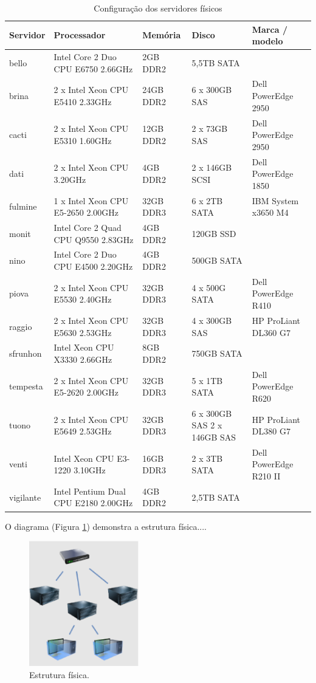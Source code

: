 \begin{table}
\caption {Configuração dos servidores físicos}
\label{tab:servfisicos}
\begin{center}
\begin{tabular}{|l|p{3.8cm}|l|p{3cm}|l|}\hline
Servidor & Processador & Memória & Disco & Marca / modelo\\\hline
bello & Intel Core 2 Duo CPU E6750 2.66GHz & 2GB DDR2 & 5,5TB SATA & \\\hline
brina & 2 x Intel Xeon CPU E5410 2.33GHz & 24GB DDR2 & 6 x 300GB SAS & Dell PowerEdge 2950\\\hline
cacti & 2 x Intel Xeon CPU E5310 1.60GHz & 12GB DDR2 & 2 x 73GB SAS & Dell PowerEdge 2950\\\hline
dati & 2 x Intel Xeon CPU 3.20GHz & 4GB DDR2 & 2 x 146GB SCSI & Dell PowerEdge 1850\\\hline
fulmine & 1 x Intel Xeon CPU E5-2650 2.00GHz & 32GB DDR3 & 6 x 2TB SATA & IBM System x3650 M4\\\hline
monit & Intel Core 2 Quad CPU Q9550 2.83GHz & 4GB DDR2 & 120GB SSD & \\\hline
nino & Intel Core 2 Duo CPU E4500 2.20GHz & 4GB DDR2 & 500GB SATA & \\\hline
piova & 2 x Intel Xeon CPU E5530 2.40GHz & 32GB DDR3 & 4 x 500G SATA & Dell PowerEdge R410\\\hline
raggio & 2 x  Intel Xeon CPU E5630 2.53GHz & 32GB DDR3 & 4 x 300GB SAS & HP ProLiant DL360 G7\\\hline
sfrunhon & Intel Xeon CPU X3330 2.66GHz & 8GB DDR2 & 750GB SATA & \\\hline
tempesta & 2 x Intel Xeon CPU E5-2620 2.00GHz & 32GB DDR3 & 5 x 1TB SATA & Dell PowerEdge R620\\\hline
tuono & 2 x Intel Xeon CPU E5649 2.53GHz & 32GB DDR3 & 6 x 300GB SAS 2 x 146GB SAS & HP ProLiant DL380 G7\\\hline
venti & Intel Xeon CPU E3-1220 3.10GHz & 16GB DDR3 & 2 x 3TB SATA & Dell PowerEdge R210 II\\\hline
vigilante & Intel Pentium Dual CPU E2180 2.00GHz & 4GB DDR2 & 2,5TB SATA & \\\hline
\end{tabular}
\end{center}
\end{table}

O diagrama (Figura \ref{fig:servfisicos}) demonstra a estrutura física....

\begin{figure}[servfisicos]
 \centering
 \includegraphics[width=180px]{img/servfisicos.eps}
 \caption{Estrutura física.}
 \label{fig:servfisicos}
\end{figure}

